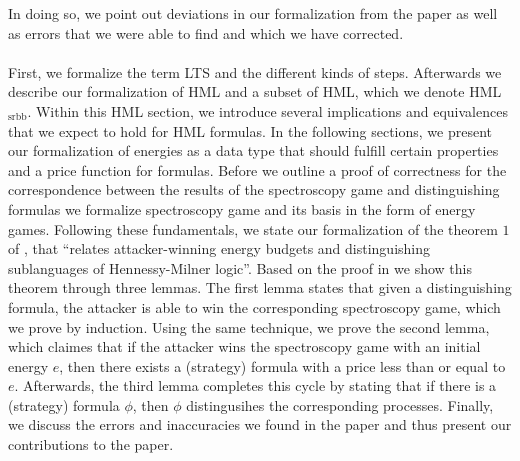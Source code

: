 In doing so, we point out deviations in our formalization from the paper as well as errors that we were able to find and which we have corrected.
\\\\
First, we formalize the term LTS and the different kinds of steps.
Afterwards we describe our formalization of HML and a subset of HML, which we denote HML$_\text{srbb}$.
Within this HML section, we introduce several implications and equivalences that we expect to hold for HML formulas.
In the following sections, we present our formalization of energies as a data type that should fulfill certain properties and a price function for formulas.
Before we outline a proof of correctness for the correspondence between the results of the spectroscopy game and distinguishing formulas we formalize spectroscopy game and its basis in the form of energy games.
Following these fundamentals, we state our formalization of the theorem $1$ of \cite{bisping2023lineartimebranchingtime}, that ``relates attacker-winning energy budgets and distinguishing sublanguages of Hennessy-Milner logic''. 
Based on the proof in \cite{bisping2023lineartimebranchingtime} we show this theorem through three lemmas. 
The first lemma states that given a distinguishing formula, the attacker is able to win the corresponding spectroscopy game, which we prove by induction.
Using the same technique, we prove the second lemma, which claimes that if the attacker wins the spectroscopy game with an initial energy $e$, then there exists a (strategy) formula with a price less than or equal to $e$.
Afterwards, the third lemma completes this cycle by stating that if there is a (strategy) formula $\phi$, then $\phi$ distingusihes the corresponding processes.
Finally, we discuss the errors and inaccuracies we found in the paper and thus present our contributions to the paper\cite{bisping2023lineartimebranchingtime}.